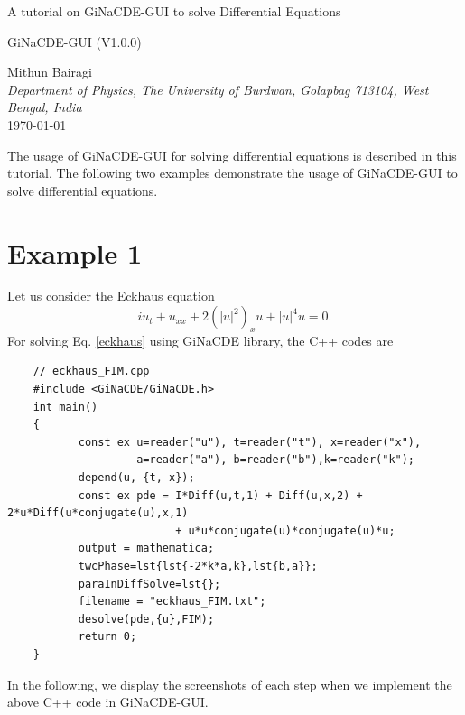 \documentclass[11pt,a4paper,titlepage]{article}
\begin{document}
\begin{titlepage}
\begin{center}
\Huge {A tutorial on GiNaCDE-GUI to solve Differential Equations} 
\end{center}
\vspace{3cm}
\begin{center}
\Large{GiNaCDE-GUI (V1.0.0)}
\end{center}
\vspace{2cm} 
\begin{center} 
Mithun Bairagi \\[3pt]  
\textit{Department of Physics, The University of Burdwan, Golapbag 713104, West Bengal, India} \\ [1cm]
\today
\end{center}
\end{titlepage}
 
\clearpage
The usage of GiNaCDE-GUI for solving differential equations is described in this tutorial. The following two examples demonstrate the usage of GiNaCDE-GUI to solve differential equations.
\section{Example 1}
Let us consider the Eckhaus equation 
\begin{equation}\label{eckhaus}
	i{u_t} + {u_{xx}} + 2{\left( {{{\left| u \right|}^2}} \right)_x}u + {\left| u \right|^4}u = 0.
\end{equation}
For solving Eq. \eqref{eckhaus} using GiNaCDE library, the C++ codes are\\
\begin{verbatim}
	// eckhaus_FIM.cpp
	#include <GiNaCDE/GiNaCDE.h>
	int main()
	{
		   const ex u=reader("u"), t=reader("t"), x=reader("x"), 
		            a=reader("a"), b=reader("b"),k=reader("k");   
		   depend(u, {t, x});
		   const ex pde = I*Diff(u,t,1) + Diff(u,x,2) + 2*u*Diff(u*conjugate(u),x,1)
		                  + u*u*conjugate(u)*conjugate(u)*u;
		   output = mathematica;  
		   twcPhase=lst{lst{-2*k*a,k},lst{b,a}};
		   paraInDiffSolve=lst{};
		   filename = "eckhaus_FIM.txt";
		   desolve(pde,{u},FIM);
		   return 0;
	}
\end{verbatim}
In the following, we display the screenshots of each step when we implement the above C++ code in GiNaCDE-GUI.
\end{document}
